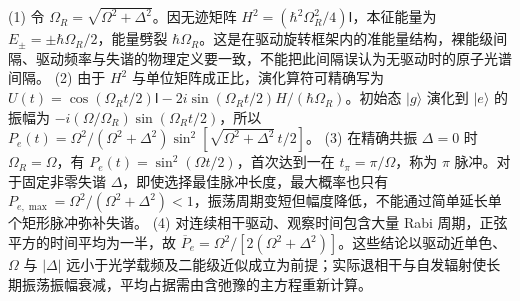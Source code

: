 (1) 令 \(\Omega_R=\sqrt{\Omega^2+\Delta^2}\)。因无迹矩阵 \(H^2=(\hbar^2\Omega_R^2/4)\mathsf I\)，本征能量为 \(E_\pm=\pm\hbar\Omega_R/2\)，能量劈裂 \(\hbar\Omega_R\)。这是在驱动旋转框架内的准能量结构，裸能级间隔、驱动频率与失谐的物理定义要一致，不能把此间隔误认为无驱动时的原子光谱间隔。
(2) 由于 \(H^2\) 与单位矩阵成正比，演化算符可精确写为 \(U(t)=\cos(\Omega_Rt/2)\mathsf I-2i\sin(\Omega_Rt/2)H/(\hbar\Omega_R)\)。初始态 \(|g\rangle\) 演化到 \(|e\rangle\) 的振幅为 \(-i(\Omega/\Omega_R)\sin(\Omega_Rt/2)\)，所以 \(P_e(t)=\Omega^2/(\Omega^2+\Delta^2)\sin^2[\sqrt{\Omega^2+\Delta^2}\,t/2]\)。
(3) 在精确共振 \(\Delta=0\) 时 \(\Omega_R=\Omega\)，有 \(P_e(t)=\sin^2(\Omega t/2)\)，首次达到一在 \(t_\pi=\pi/\Omega\)，称为 \(\pi\) 脉冲。对于固定非零失谐 \(\Delta\)，即使选择最佳脉冲长度，最大概率也只有 \(P_{e,\max}=\Omega^2/(\Omega^2+\Delta^2)<1\)，振荡周期变短但幅度降低，不能通过简单延长单个矩形脉冲弥补失谐。
(4) 对连续相干驱动、观察时间包含大量 Rabi 周期，正弦平方的时间平均为一半，故 \(\overline P_e=\Omega^2/[2(\Omega^2+\Delta^2)]\)。这些结论以驱动近单色、\(\Omega\) 与 \(|\Delta|\) 远小于光学载频及二能级近似成立为前提；实际退相干与自发辐射使长期振荡振幅衰减，平均占据需由含弛豫的主方程重新计算。
